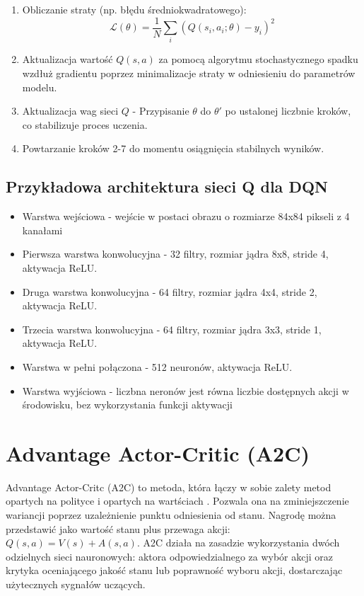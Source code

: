 \documentclass[a4paper, 12pt]{article}
\numberwithin{equation}{section}
\begin{document}
\begin{enumerate}
        \item Obliczanie straty (np. błędu średniokwadratowego):
        \begin{equation}
        \mathcal{L}(\theta) = \frac{1}{N} \sum_{i}(Q(s_i,a_i;\theta)-y_i)^2 
        \end{equation}
        \item Aktualizacja wartość \( Q(s,a) \) za pomocą algorytmu stochastycznego spadku wzdłuż gradientu poprzez minimalizacje straty w odniesieniu do parametrów modelu.
        \item Aktualizacja wag sieci \( Q \) - Przypisanie \( \theta \) do \( \theta' \) po ustalonej liczbnie kroków, co stabilizuje proces uczenia.
        \item Powtarzanie kroków 2-7 do momentu osiągnięcia stabilnych wyników.
    \end{enumerate}
    \subsection{Przykładowa architektura sieci Q dla DQN}
    \begin{itemize}
        \item Warstwa wejściowa - wejście w postaci obrazu o rozmiarze 84x84 pikseli z 4 kanałami
        \item Pierwsza warstwa konwolucyjna - 32 filtry, rozmiar jądra 8x8, stride 4, aktywacja ReLU.
        \item Druga warstwa konwolucyjna - 64 filtry, rozmiar jądra 4x4, stride 2, aktywacja ReLU.
        \item Trzecia warstwa konwolucyjna - 64 filtry, rozmiar jądra 3x3, stride 1, aktywacja ReLU.
        \item Warstwa w pełni połączona - 512 neuronów, aktywacja ReLU.
        \item Warstwa wyjściowa - liczbna neronów jest równa liczbie dostępnych akcji w środowisku, bez wykorzystania funkcji aktywacji
    \end{itemize}
    \section{Advantage Actor-Critic (A2C)}
    Advantage Actor-Critc (A2C) to metoda, która łączy w sobie zalety metod opartych na polityce i opartych na wartściach \cite{mnih2016a3c} \cite{stable_baselines_a2c}.
    Pozwala ona na zminiejszczenie wariancji poprzez uzależnienie punktu odniesienia od stanu. Nagrodę można przedstawić
    jako wartość stanu plus przewaga akcji: \( Q(s,a) = V(s) + A(s,a) \). A2C działa na zasadzie wykorzystania dwóch odzielnych
    sieci nauronowych: aktora odpowiedzialnego za wybór akcji oraz krytyka oceniającego jakość stanu lub poprawność wyboru akcji, dostarczając użytecznych sygnałów uczących.
\end{document}
